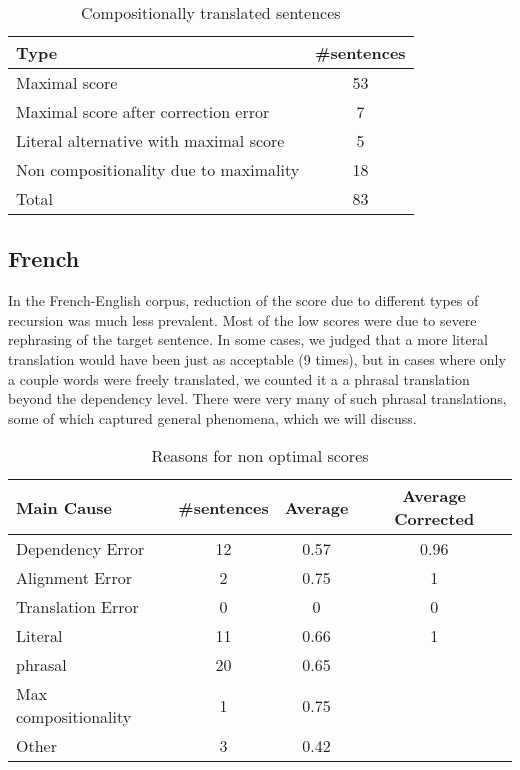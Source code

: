\begin{table}[!ht]
\centering
\begin{tabular}{|l|c|}
\hline
\textbf{Type} & \textbf{\#sentences}\\
\hline
\hline
Maximal score & 53 \\
\hline
Maximal score after correction error & 7\\
\hline
Literal alternative with maximal score & 5\\
\hline
Non compositionality due to maximality & 18\\
\hline
Total & 83\\
\hline
\end{tabular}
\caption{Compositionally translated sentences}\label{tab:optimal_score}
\end{table}

\subsection{French}

In the French-English corpus, reduction of the score due to different types of recursion was much less prevalent. Most of the low scores were due to severe rephrasing of the target sentence. In some cases, we judged that a more literal translation would have been just as acceptable (9 times), but in cases where only a couple words were freely translated, we counted it a a phrasal translation beyond the dependency level. There were very many of such phrasal translations, some of which captured general phenomena, which we will discuss.

\begin{table}[!ht]
\centering
\begin{tabular}{|l|c|c|c|}
\hline
\textbf{Main Cause} & \textbf{\#sentences} & \textbf{Average} & \textbf{Average Corrected}\\
\hline \hline
Dependency Error & 12 & 0.57 & 0.96\\
\hline
Alignment Error & 2 & 0.75 & 1\\
\hline
Translation Error & 0 & 0 & 0 \\
\hline
Literal & 11 & 0.66  & 1\\
\hline
phrasal& 20 & 0.65 \\
\cline{1-3}
Max compositionality & 1 & 0.75\\
\cline{1-3}
Other & 3 & 0.42\\
\cline{1-3}
\end{tabular}
\caption{Reasons for non optimal scores}\label{tab:non_optimal2}
\end{table}

